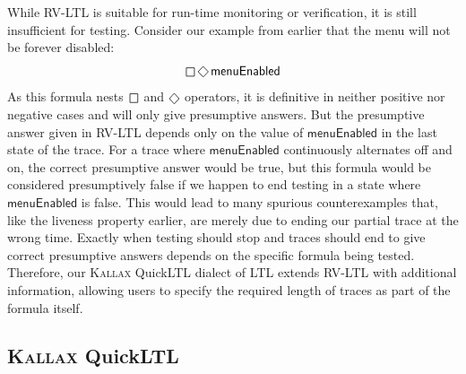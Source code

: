 \documentclass[sigplan,nonacm,10pt]{acmart}
\makeatletter
\newcommand{\QuickLTL}[0]{%
    \if@ACM@anonymous%
    \textsc{Kallax}%
    \else%
    QuickLTL%
    \fi\xspace}
\newcommand{\Eventually}{\operatorname{%
  \tikz[baseline]{
    \draw[line width=.12ex,line join=round]
      (0ex,.6ex) -- (.95ex,1.55ex) -- (1.9ex,.6ex) -- (.95ex,-.35ex) -- cycle;
  }}}{}
\newcommand{\Always}{\operatorname{%
  \tikz[baseline]{
    \draw[draw=white] (-0.2ex,0ex) -- (1.7ex,0ex);
    \draw[line width=.12ex,line join=round]
      (0ex,-.2ex) -- (0ex,1.3ex) -- (1.5ex,1.3ex) -- (1.5ex,.-.2ex) -- cycle;
  }}}{}
\makeatother
\begin{document}
While RV-LTL is suitable for run-time monitoring or verification, it is still insufficient for testing. Consider our example from earlier
that the menu will not be forever disabled:
$$\Always \Eventually \textsf{menuEnabled}$$
As this formula nests $\Always$ and $\Eventually$ operators, it is definitive in neither positive nor negative cases and will only give presumptive answers.  But the
presumptive answer given in RV-LTL depends only on the value of $\textsf{menuEnabled}$ in the last state of the trace. For a trace where $\textsf{menuEnabled}$ continuously alternates off and on,
the correct presumptive answer would be true, but this formula would be considered presumptively false if we happen to end testing in a state where $\textsf{menuEnabled}$ is false. This would lead to many spurious
counterexamples that, like the liveness property earlier, are merely due to ending our partial trace at the wrong time. Exactly when testing should stop and traces should end to give correct presumptive answers depends
 on the specific formula being tested. Therefore, our \QuickLTL dialect of LTL extends RV-LTL with additional information, allowing users to specify the required length of traces as part of the formula itself.

\subsection{\QuickLTL}
\end{document}
